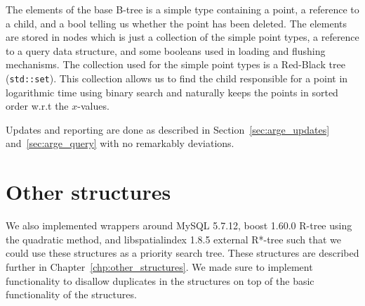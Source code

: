 \documentclass[twoside,11pt,openright]{report}
\begin{document}
The elements of the base B-tree is a simple type containing a point, a reference to a child, and a bool telling us whether the point has been deleted. The elements are stored in nodes which is just a collection of the simple point types, a reference to a query data structure, and some booleans used in loading and flushing mechanisms. The collection used for the simple point types is a Red-Black tree (\texttt{std::set}). This collection allows us to find the child responsible for a point in logarithmic time using binary search and naturally keeps the points in sorted order w.r.t the $x$-values.

Updates and reporting are done as described in Section~\ref{sec:arge_updates} and~\ref{sec:arge_query} with no remarkably deviations.

\section{Other structures}
We also implemented wrappers around MySQL 5.7.12, boost 1.60.0 R-tree using the quadratic method, and libspatialindex 1.8.5 external R*-tree such that we could use these structures as a priority search tree. These structures are described further in Chapter~\ref{chp:other_structures}. We made sure to implement functionality to disallow duplicates in the structures on top of the basic functionality of the structures.
\end{document}
